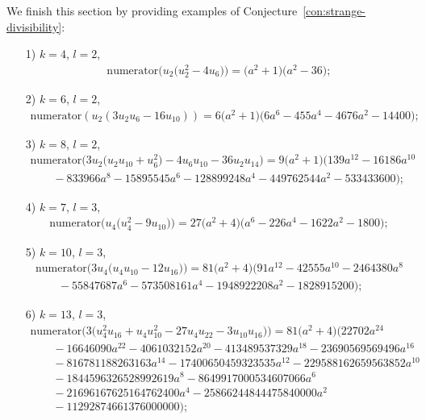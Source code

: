 \documentclass[pdftex]{sigma}
\numberwithin{equation}{section}
\begin{document}
We finish this section by providing examples of Conjecture~\ref{con:strange-divisibility}:
\begin{enumerate}\itemsep=0pt
\item[1)] $k=4$, $l=2$,
\begin{gather*}
\mathrm{numerator}\big(u_2\big(u_2^2-4u_6\big)\big)=\big(a^2+1\big)\big(a^2-36\big);
\end{gather*}
\item[2)] $k=6$, $l=2$,
\begin{gather*}
\mathrm{numerator}(u_2(3u_2u_6-16u_{10}))=6\big(a^2+1\big)\big(6a^6-455a^4-4676a^2-14400\big);
\end{gather*}
\item[3)] $k=8$, $l=2$,
\begin{gather*}
\mathrm{numerator}
\big(3u_2\big(u_2u_{10}+u_6^2\big)-4u_6u_{10}-36u_2u_{14}\big)=9\big(a^2+1\big)\big(139a^{12}-16186a^{10}\\
\qquad{}-833966a^8-15895545a^6-128899248a^4-449762544a^2-533433600\big);
\end{gather*}
\item[4)] $k=7$, $l=3$,
\begin{gather*}
\mathrm{numerator}\big(u_4\big(u_4^2-9u_{10}\big)\big)=27\big(a^2+4\big)\big(a^6-226a^4-1622a^2-1800\big);
\end{gather*}
\item[5)] $k=10$, $l=3$,
\begin{gather*}
\mathrm{numerator}\big(3u_4\big(u_4u_{10}-12u_{16}\big)\big)=81\big(a^2+4\big)\big(91a^{12}-42555a^{10}-2464380a^8\\
\qquad{} -55847687a^6-573508161a^4-1948922208a^2-1828915200\big);
\end{gather*}
\item[6)]$k=13$, $l=3$,
\begin{gather*}
\mathrm{numerator}\big(3\big(u_4^2u_{16}+u_4u_{10}^2-27u_4u_{22}-3u_{10}u_{16}\big)\big)=81\big(a^2+4\big)\big(22702a^{24}\\
\qquad{} -16646090a^{22}-4061032152a^{20}-413489537329a^{18}-23690569569496a^{16}\\
\qquad{}- 816781188263163a^{14}-17400650459323535a^{12}-229588162659563852a^{10}\\
\qquad{} -1844596326528992619a^8-8649917000534607066a^6\\
\qquad{} -21696167625164762400a^4 -25866244844475840000a^2\\
\qquad{}-11292874661376000000\big);
\end{gather*}

\end{enumerate}
\end{document}
